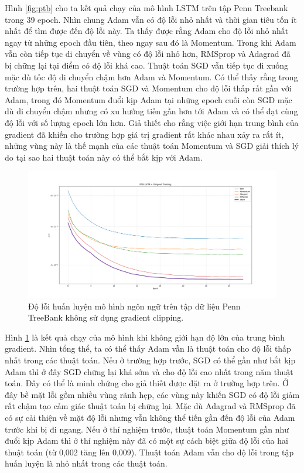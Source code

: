 Hình \ref{fig:ptb} cho ta kết quả chạy của mô hình LSTM trên tập Penn Treebank trong 39 epoch. Nhìn chung Adam vẫn có độ lỗi nhỏ nhất và thời gian tiêu tốn ít nhất để tìm được đến độ lỗi này. Ta thấy được rằng Adam cho độ lỗi nhỏ nhất ngay từ những epoch đầu tiên, theo ngay sau đó là Momentum. Trong khi Adam vẫn còn tiếp tục di chuyển về vùng có độ lỗi nhỏ hơn, RMSprop và Adagrad đã bị chững lại tại điểm có độ lỗi khá cao. Thuật toán SGD vẫn tiếp tục đi xuống mặc dù tốc độ di chuyển chậm hơn Adam và Momentum. Có thể thấy rằng trong trường hợp trên, hai thuật toán SGD và Momentum cho độ lỗi thấp rất gần với Adam, trong đó Momentum đuổi kịp Adam tại những epoch cuối còn SGD mặc dù di chuyển chậm nhưng có xu hướng tiến gần hơn tới Adam và có thể đạt cùng độ lỗi với số lượng epoch lớn hơn. Giả thiết cho rằng việc giới hạn trung bình của gradient đã khiến cho trường hợp giá trị gradient rất khác nhau xảy ra rất ít, những vùng này là thế mạnh của các thuật toán Momentum và SGD giải thích lý do tại sao hai thuật toán này có thể bắt kịp với Adam.

\begin{figure}[htp]
	\centering
	\includegraphics[width=140 mm]{images/ptb2.png}
	\caption{Độ lỗi huấn luyện mô hình ngôn ngữ trên tập dữ liệu Penn TreeBank không sử dụng gradient clipping.}
	\label{fig:ptb2}
\end{figure}

Hình \ref{fig:ptb2} là kết quả chạy của mô hình khi không giới hạn độ lớn của trung bình gradient. Nhìn tổng thể, ta có thể thấy Adam vẫn là thuật toán cho độ lỗi thấp nhất trong các thuật toán. Nếu ở trường hợp trước, SGD có thể gần như bắt kịp Adam thì ở đây SGD chững lại khá sớm và cho độ lỗi cao nhất trong năm thuật toán. Đây có thể là minh chứng cho giả thiết được đặt ra ở trường hợp trên. Ở đây bề mặt lỗi gồm nhiều vùng rãnh hẹp, các vùng này khiến SGD có độ lỗi giảm rất chậm tạo cảm giác thuật toán bị chững lại. Mặc dù Adagrad và RMSprop đã có sự cải thiện về mặt độ lỗi nhưng vẫn không thể tiến gần đến độ lỗi của Adam trước khi bị đi ngang. Nếu ở thí nghiệm trước, thuật toán Momentum gần như đuổi kịp Adam thì ở thí nghiệm này đã có một sự cách biệt giữa độ lỗi của hai thuật toán (từ 0,002 tăng lên 0,009). Thuật toán Adam vẫn cho độ lỗi trong tập huấn luyện là nhỏ nhất trong các thuật toán.

